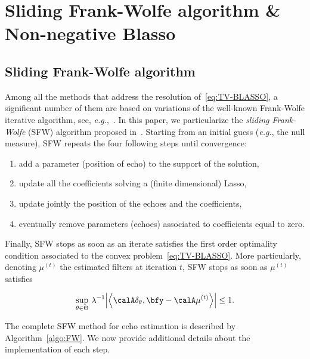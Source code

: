 \chapter{Sliding Frank-Wolfe algorithm \& Non-negative Blasso}

\section{Sliding Frank-Wolfe algorithm} \label{sec:suppblaster:SFW}

Among all the methods that address the resolution of~\eqref{eq:TV-BLASSO}, a significant number of them are based on variations of the well-known Frank-Wolfe iterative algorithm, see, \textit{e.g.},~\cite{Bredies2013,Rao2015,denoyelle2019}.
In this paper, we particularize the \emph{sliding Frank-Wolfe} (SFW) algorithm proposed in~\cite{denoyelle2019}.
Starting from an initial guess (\textit{e.g.}, the null measure), SFW repeats the four following steps until convergence:
\begin{enumerate}
	\item add a parameter (position of echo) to the support of the solution,
	\item update all the coefficients solving a (finite dimensional) Lasso,
	\item update jointly the position of the echoes  and the coefficients,
	\item eventually remove parameters (echoes) associated to coefficients equal to zero.
\end{enumerate}
Finally, SFW stops as soon as an iterate satisfies the first order optimality condition associated to the convex problem~\eqref{eq:TV-BLASSO}.
More particularly, denoting $\mu^{(t)}$ the estimated filters at iteration $t$, SFW stops as soon as $\mu^{(t)}$ satisfies~\cite[Proposition 3.6]{Bredies2013}


\begin{equation}
	\label{eq:blasso-dual_certif}
	\sup_{\theta\in\Theta} \,\kinv{\lambda}\kvbar{ \kangle{
		\opObs{}\spike{\theta}, \bfy - \opObs{}\mu^{(t)}
	}}
	\leq 1
	.
\end{equation}


The complete SFW method for echo estimation is described by Algorithm~\ref{algo:FW}.
We now provide additional details about the implementation of each step.


